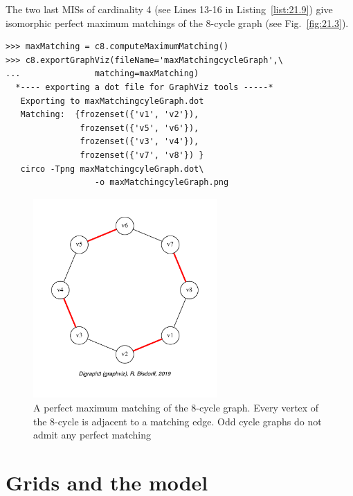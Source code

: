 The two last MISs of cardinality 4 (see Lines 13-16 in Listing~\vref{list:21.9}) give isomorphic perfect maximum matchings of the 8-cycle graph (see Fig.~\vref{fig:21.3}). 
\begin{lstlisting}[caption={Computing maximum matchings in the 8-cycle graph},label=list:21.10]
>>> maxMatching = c8.computeMaximumMatching()
>>> c8.exportGraphViz(fileName='maxMatchingcycleGraph',\
...   		      matching=maxMatching)
  *---- exporting a dot file for GraphViz tools -----*
   Exporting to maxMatchingcyleGraph.dot
   Matching:  {frozenset({'v1', 'v2'}),
               frozenset({'v5', 'v6'}),
               frozenset({'v3', 'v4'}),
               frozenset({'v7', 'v8'}) }
   circo -Tpng maxMatchingcyleGraph.dot\
                  -o maxMatchingcyleGraph.png
\end{lstlisting}
\begin{figure}[h]
\sidecaption[t]
\includegraphics[width=7cm]{Figures/21-3-maxMatchingcycleGraph.pdf}
\caption{A perfect maximum matching of the 8-cycle graph. Every vertex of the 8-cycle is adjacent to a matching edge. Odd cycle graphs do not admit any perfect matching} 
\label{fig:21.3}       %
\end{figure}
	    
\section{Grids and the \Ising model}
\label{sec:21.5}

